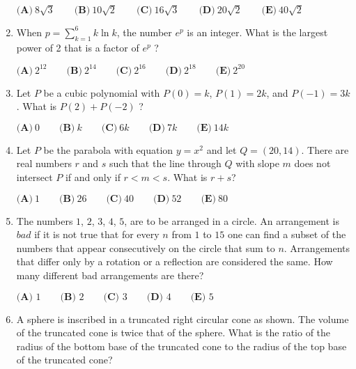 \documentclass{article}
\begin{document}
\begin{enumerate}[label=\arabic*., itemsep=0.5em]
\( \textbf{(A)}\ 8\sqrt{3}\qquad\textbf{(B)}\ 10\sqrt{2}\qquad\textbf{(C)}\ 16\sqrt{3}\qquad\textbf{(D)}\ 20\sqrt{2}\qquad\textbf{(E)}\ 40\sqrt{2} \)\par \vspace{0.5em}\item When \(p = \sum\limits_{k=1}^{6} k \ln{k}\), the number \(e^p\) is an integer.  What is the largest power of 2 that is a factor of \(e^p\) ?

\( \textbf{(A)}\ 2^{12}\qquad\textbf{(B)}\ 2^{14}\qquad\textbf{(C)}\ 2^{16}\qquad\textbf{(D)}\ 2^{18}\qquad\textbf{(E)}\ 2^{20} \)\par \vspace{0.5em}\item Let \(P\) be a cubic polynomial with \(P(0) = k\), \(P(1) = 2k\), and \(P(-1) = 3k\).  What is \(P(2) + P(-2)\) ?

\( \textbf{(A)}\ 0\qquad\textbf{(B)}\ k\qquad\textbf{(C)}\ 6k\qquad\textbf{(D)}\ 7k\qquad\textbf{(E)}\ 14k \)\par \vspace{0.5em}\item Let \(P\) be the parabola with equation \(y=x^2\) and let \(Q = (20, 14)\). There are real numbers \(r\) and \(s\) such that the line through \(Q\) with slope \(m\) does not intersect \(P\) if and only if \(r < m < s\). What is \(r + s\)?

\( \textbf{(A)}\ 1\qquad\textbf{(B)}\ 26\qquad\textbf{(C)}\ 40\qquad\textbf{(D)}\ 52\qquad\textbf{(E)}\ 80 \)\par \vspace{0.5em}\item The numbers \(1\), \(2\), \(3\), \(4\), \(5\), are to be arranged in a circle.  An arrangement is \(\textit{bad}\) if it is not true that for every \(n\) from \(1\) to \(15\) one can find a subset of the numbers that appear consecutively on the circle that sum to \(n\).  Arrangements that differ only by a rotation or a reflection are considered the same.  How many different bad arrangements are there?

\( \textbf{(A) }1\qquad\textbf{(B) }2\qquad\textbf{(C) }3\qquad\textbf{(D) }4\qquad\textbf{(E) }5 \)\par \vspace{0.5em}\item A sphere is inscribed in a truncated right circular cone as shown. The volume of the truncated cone is twice that of the sphere. What is the ratio of the radius of the bottom base of the truncated cone to the radius of the top base of the truncated cone?


\end{enumerate}
\end{document}
